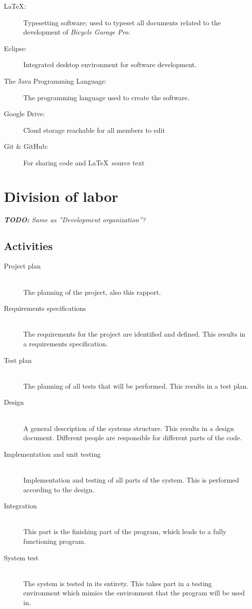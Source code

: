 \documentclass[12pt,titlepage]{article}
\begin{document}
\begin{description}
	\item[\LaTeX:] Typesetting software; used to typeset all documents
		related to the development of \textit{Bicycle Garage Pro}.
	\item[Eclipse:] Integrated desktop environment for software development.
	\item[The Java Programming Language:] The programming language used to
		create the software.
	\item[Google Drive:] Cloud storage reachable for all members to edit
	\item[Git \& GitHub:] For sharing code and \LaTeX~source text
\end{description}


\section{Division of labor}

\textit{\textbf{TODO:} Same as ''Development organization''?} \\

\subsection{Activities}

\begin{description}
	\item[Project plan] \hfill \\
		The planning of the project, also this rapport.
	\item[Requirements specifications] \hfill \\
		The requirements for the project are identified and defined.
		This results in a requirements specification.
	\item[Test plan] \hfill \\
		The planning of all tests that will be performed.
		This results in a test plan.
	\item[Design] \hfill \\
		A general description of the systems structure.
		This results in a design document.
		Different people are responsible for different parts of the code.
	\item[Implementation and unit testing] \hfill \\
		Implementation and testing of all parts of the system.
		This is performed according to the design.
	\item[Integration] \hfill \\
		This part is the finishing part of the program,
		which leads to a fully functioning program.
	\item[System test] \hfill \\
		The system is tested in its entirety. This takes part in a
		testing environment which mimics the environment that the
		program will be used in.
\end{description}
\end{document}
